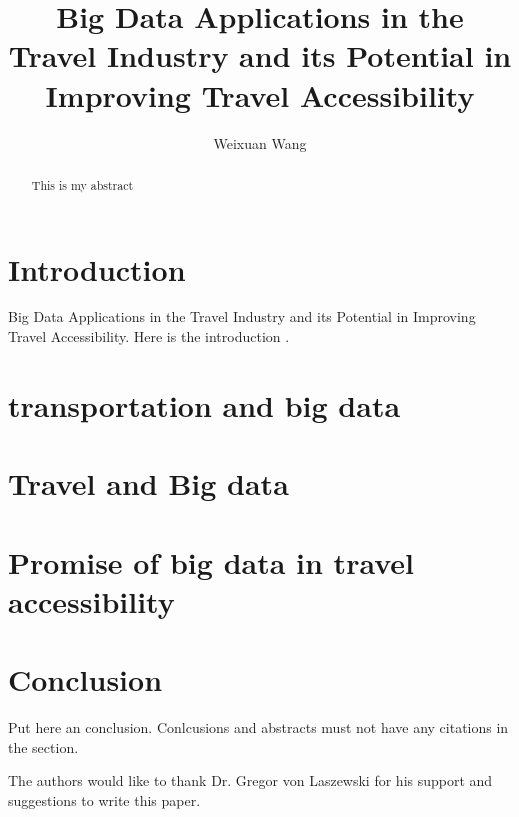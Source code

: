 \title{Big Data Applications in the Travel Industry and its Potential in Improving Travel Accessibility}


\author{Weixuan Wang}


\renewcommand{\shortauthors}{Weixuan Wang}


\begin{abstract}
This is my abstract
\end{abstract}



\maketitle



\section{Introduction}

Big Data Applications in the Travel Industry and its Potential in Improving Travel Accessibility.
Here is the introduction \cite{editor00}.

\section{transportation and big data}

\section{Travel and Big data}

\section{Promise of big data in travel accessibility}


\section{Conclusion}

Put here an conclusion. Conlcusions and abstracts must not have any
citations in the section.


\begin{acks}

  The authors would like to thank Dr. Gregor von Laszewski for his
  support and suggestions to write this paper.

\end{acks}


 



